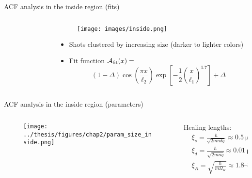 \documentclass[aspectratio=169]{beamer}
\begin{document}

\begin{frame}{ACF analysis in the inside region (fits)}
  \begin{columns}
    \begin{column}{0.50\textwidth}
      \begin{figure}
        \centering
      \end{figure}
    \end{column}
    \begin{column}{0.50\textwidth}
      \begin{figure}
        \centering
        \texttt{[image: images/inside.png]}
      \end{figure}
      \begin{itemize}
        \item Shots clustered by increasing size (darker to lighter colors)
        \item Fit function $\mathcal{A}_{\rm fit}(x) = $
        \begin{equation*}
          (1 - \Delta)\cos(\frac{\pi x}{\ell_2})\exp[-\frac{1}{2}\left(\frac{x}{\ell_1}\right)^{1.7}] + \Delta
        \end{equation*}
      \end{itemize}
    \end{column}
  \end{columns}
\end{frame}

\begin{frame}{ACF analysis in the inside region (parameters)}
  \begin{columns}
    \begin{column}{0.7\textwidth}
      \begin{figure}
        \centering
        \texttt{[image: ../thesis/figures/chap2/param\_size\_inside.png]}
      \end{figure}
    \end{column}
    \begin{column}{0.3\textwidth}
      Healing lengths:
      \begin{align*}
        &\xi_s = \frac{\hbar}{\sqrt{2mn\delta g}} \approx 0.5\ \unit{\micro\meter}\\
        &\xi_d = \frac{\hbar}{\sqrt{2mn\overline{g}}} \approx 0.01\ \unit{\micro\meter}\\
        &\xi_R = \sqrt{\frac{\hbar}{m\Omega_R}} \approx \numrange[range-phrase=-]{1.8}{3.0}\ \unit{\micro\meter}
      \end{align*}
    \end{column}
  \end{columns}
\end{frame}
\end{document}
